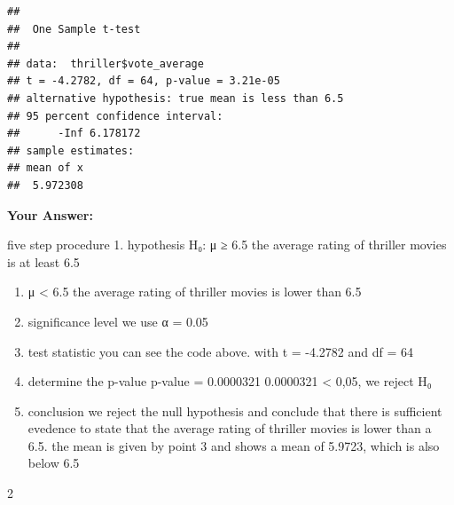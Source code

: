 \documentclass[
]{article}
\begin{document}
\begin{verbatim}
## 
##  One Sample t-test
## 
## data:  thriller$vote_average
## t = -4.2782, df = 64, p-value = 3.21e-05
## alternative hypothesis: true mean is less than 6.5
## 95 percent confidence interval:
##      -Inf 6.178172
## sample estimates:
## mean of x 
##  5.972308
\end{verbatim}

\textbf{Your Answer:}

five step procedure 1. hypothesis H₀: μ ≥ 6.5 the average rating of
thriller movies is at least 6.5

\begin{enumerate}
\def\labelenumi{\arabic{enumi}.}
\item
  μ \textless{} 6.5 the average rating of thriller movies is lower than
  6.5
\item
  significance level we use α = 0.05
\item
  test statistic you can see the code above. with t = -4.2782 and df =
  64
\item
  determine the p-value p-value = 0.0000321 0.0000321 \textless{} 0,05,
  we reject H₀
\item
  conclusion we reject the null hypothesis and conclude that there is
  sufficient evedence to state that the average rating of thriller
  movies is lower than a 6.5. the mean is given by point 3 and shows a
  mean of 5.9723, which is also below 6.5
\end{enumerate}

2
\end{document}
